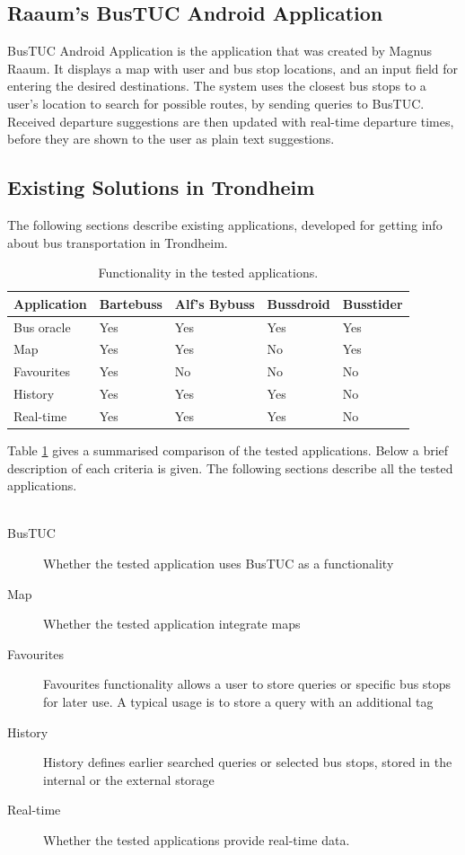 \subsection{Raaum's BusTUC Android Application}

BusTUC Android Application is the application that was created by Magnus Raaum\cite{mag}. It displays a map with user and bus stop locations, and an input field for entering the desired destinations. The system uses the closest bus stops to a user's location to search for possible routes, by sending queries to BusTUC. Received departure suggestions are then updated with real-time departure times, before they are shown to the user as plain text suggestions.

\subsection{Existing Solutions in Trondheim}
\label{sec:existingtrondheim}
The following sections describe existing applications, developed for getting info about bus transportation in Trondheim. 
\begin{table}[!h]
\label{tab:funcintest}
\begin{center}
   \caption{Functionality in the tested applications.}
    \begin{tabular}{ |  l  |  l  |  l  |  l  |  l  |  }
    \hline
    Application & Bartebuss & Alf's Bybuss & Bussdroid & Busstider\\ \hline
    Bus oracle & Yes & Yes & Yes & Yes \\ \hline
    Map & Yes  & Yes & No & Yes \\ \hline
    Favourites & Yes & No & No & No \\ \hline
    History & Yes & Yes & Yes & No \\ \hline
    Real-time & Yes & Yes & Yes & No \\ \hline
    \end{tabular}
\end{center}
\end{table}
Table \ref{tab:funcintest} gives a summarised comparison of the tested applications. Below a brief description of each criteria is given. The following sections describe all the tested applications.
\\\\
\newpage
\begin{description}
\item [BusTUC]
Whether the tested application uses BusTUC as a functionality
\item [Map]
Whether the tested application integrate maps
\item [Favourites]
Favourites functionality allows a user to store queries or specific bus stops for later use. A typical usage is to store a query with an additional tag
\item [History]
History defines earlier searched queries or selected bus stops, stored in the internal or the external storage
\item [Real-time]
Whether the tested applications provide real-time data.
\end{description}

